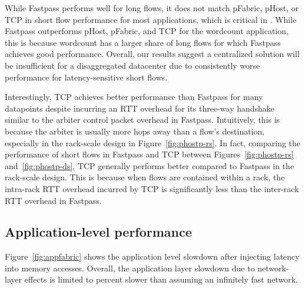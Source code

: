 While Fastpass performs well for long flows, it does not match pFabric, pHost, or TCP in short flow performance for most applications, which is critical in \dis. While Fastpass outperforms pHost, pFabric, and TCP for the wordcount application, this is because wordcount has a larger share of long flows for which Fastpass achieves good performance. Overall, our results suggest a centralized solution will be insufficient for a disaggregated datacenter due to consistently worse performance for latency-sensitive short flows.

Interestingly, TCP achieves better performance than Fastpass for many datapoints despite incurring an RTT overhead for its three-way handshake similar to the arbiter control packet overhead in Fastpass. Intuitively, this is because the arbiter is usually more hops away than a flow's destination, especially in the rack-scale design in Figure~\ref{fig:phostp-rs}. In fact, comparing the performance of short flows in Fastpass and TCP between Figures~\ref{fig:phostp-rs} and~\ref{fig:phostp-ds}, TCP generally performs better compared to Fastpass in the rack-scale design. This is because when flows are contained within a rack, the intra-rack RTT overhead incurred by TCP is significantly less than the inter-rack RTT overhead in Fastpass.


\subsection{Application-level performance}
\label{ssec:alp}
Figure~\ref{fig:appfabric} shows the application level slowdown after injecting latency into memory accesses. Overall, the application layer slowdown due to network-layer effects is limited to  percent slower than assuming an infinitely fast network. 

